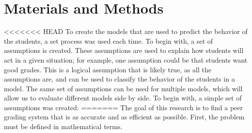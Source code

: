 \documentclass[12pt, Arial]{article}
\begin{document}
\section{Materials and Methods}
<<<<<<< HEAD
To create the models that are used to predict the behavior of the students, a set process was used each time. To begin with, a set of assumptions is created. These assumptions are used to explain how students will act in a given situation; for example, one assumption could be that students want good grades. This is a logical assumption that is likely true, as all the assumptions are, and can be used to classify the behavior of the students in a model. The same set of assumptions can be used for multiple models, which will allow us to evaluate different models side by side. To begin with, a simple set of assumptions was created:
=======
The goal of this research is to find a peer grading system that is as accurate and as efficient as possible. First, the problem must be defined in mathematical terms.
\end{document}
